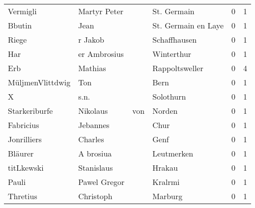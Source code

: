 \begin{tabular}{llllrr}
                 Vermigli &                       Martyr Peter &             &                                 St. Germain &          0 &         1 \\
                   Bbutin &                               Jean &             &                         St. Germain en Laye &          0 &         1 \\
                    Riege &                            r Jakob &             &                                Schaffhausen &          0 &         1 \\
                      Har &                       er Ambrosius &             &                                  Winterthur &          0 &         1 \\
                      Erb &                            Mathias &             &                              Rappoltsweller &          0 &         4 \\
         MüljmenVlittdwig &                                Ton &             &                                        Bern &          0 &         1 \\
                        X &                               s.n. &             &                                   Solothurn &          0 &         1 \\
            Starkeriburfe &                           Nikolaus &         von &                                      Norden &          0 &         1 \\
                Fabricius &                           Jebannes &             &                                        Chur &          0 &         1 \\
              Jonrilliers &                            Charles &             &                                        Genf &          0 &         1 \\
                  Bläurer &                          A brosiua &             &                                  Leutmerken &          0 &         1 \\
               titLkewski &                         Stanislaus &             &                                      Hrakau &          0 &         1 \\
                    Pauli &                       Pawel Gregor &             &                                     Kralrmi &          0 &         1 \\
                 Thretius &                          Christoph &             &                                     Marburg &          0 &         1 \\

\end{tabular}
